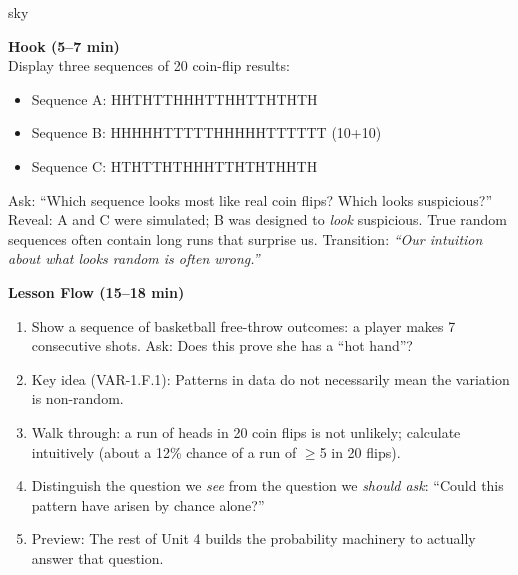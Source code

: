 \documentclass[10pt]{article}
\begin{document}
\begin{skillbox}{sky}
\begin{minipage}[t]{0.48\linewidth}
    \textbf{Hook (5--7 min)}\\
    Display three sequences of 20 coin-flip results:
    \begin{itemize}
        \item Sequence A: HHTHTTHHHTTHHTTHTHTH
        \item Sequence B: HHHHHTTTTTHHHHHTTTTTT (10+10)
        \item Sequence C: HTHTTHTHHHTTHTHTHHTH
    \end{itemize}
    Ask: ``Which sequence looks most like real coin flips? Which looks suspicious?''\\
    Reveal: A and C were simulated; B was designed to \emph{look} suspicious. True
    random sequences often contain long runs that surprise us.
    Transition: \textit{``Our intuition about what looks random is often wrong.''}
\end{minipage}
\hfill
\begin{minipage}[t]{0.48\linewidth}
    \textbf{Lesson Flow (15--18 min)}
    \begin{enumerate}
        \item Show a sequence of basketball free-throw outcomes: a player makes 7
              consecutive shots. Ask: Does this prove she has a ``hot hand''?
        \item Key idea (VAR-1.F.1): Patterns in data do not necessarily mean the
              variation is non-random.
        \item Walk through: a run of heads in 20 coin flips is not unlikely; calculate
              intuitively (about a 12\% chance of a run of $\geq$5 in 20 flips).
        \item Distinguish the question we \emph{see} from the question we \emph{should ask}:
              ``Could this pattern have arisen by chance alone?''
        \item Preview: The rest of Unit 4 builds the probability machinery to actually
              answer that question.
    \end{enumerate}
\end{minipage}
\end{skillbox}
\end{document}
